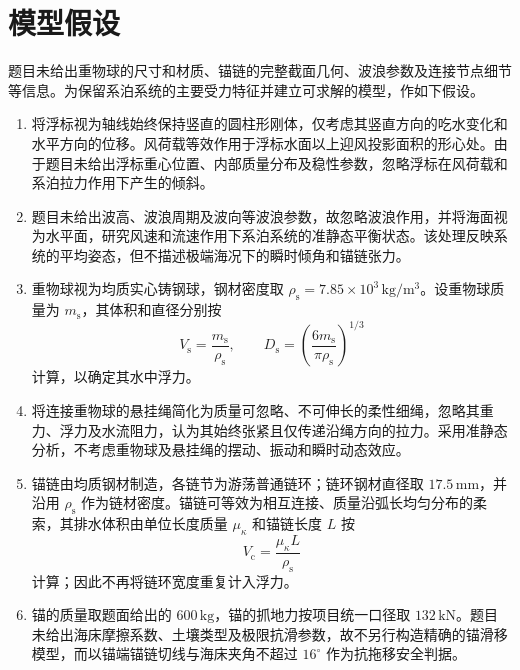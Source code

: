 \section{模型假设}
\label{sec:assumptions}

题目未给出重物球的尺寸和材质、锚链的完整截面几何、波浪参数及连接节点细节等信息。为保留系泊系统的主要受力特征并建立可求解的模型，作如下假设。

\begin{enumerate}[label=\arabic*., leftmargin=2.8em]
  \item 将浮标视为轴线始终保持竖直的圆柱形刚体，仅考虑其竖直方向的吃水变化和水平方向的位移。风荷载等效作用于浮标水面以上迎风投影面积的形心处。由于题目未给出浮标重心位置、内部质量分布及稳性参数，忽略浮标在风荷载和系泊拉力作用下产生的倾斜。

  \item 题目未给出波高、波浪周期及波向等波浪参数，故忽略波浪作用，并将海面视为水平面，研究风速和流速作用下系泊系统的准静态平衡状态。该处理反映系统的平均姿态，但不描述极端海况下的瞬时倾角和锚链张力。

  \item 重物球视为均质实心铸钢球，钢材密度取 \(\rho_{\mathrm s}=7.85\times10^{3}\,\mathrm{kg/m^3}\)。设重物球质量为 \(m_{\mathrm s}\)，其体积和直径分别按
  \begin{equation}
    V_{\mathrm s}=\frac{m_{\mathrm s}}{\rho_{\mathrm s}},
    \qquad
    D_{\mathrm s}=\left(\frac{6m_{\mathrm s}}{\pi\rho_{\mathrm s}}\right)^{1/3}
    \label{eq:ball-volume-diameter}
  \end{equation}
  计算，以确定其水中浮力。

  \item 将连接重物球的悬挂绳简化为质量可忽略、不可伸长的柔性细绳，忽略其重力、浮力及水流阻力，认为其始终张紧且仅传递沿绳方向的拉力。采用准静态分析，不考虑重物球及悬挂绳的摆动、振动和瞬时动态效应。

  \item 锚链由均质钢材制造，各链节为游荡普通链环；链环钢材直径取 \(17.5\,\mathrm{mm}\)，并沿用 \(\rho_{\mathrm s}\) 作为链材密度。锚链可等效为相互连接、质量沿弧长均匀分布的柔索，其排水体积由单位长度质量 \(\mu_{\kappa}\) 和锚链长度 \(L\) 按
  \begin{equation}
    V_{\mathrm c}=\frac{\mu_{\kappa}L}{\rho_{\mathrm s}}
    \label{eq:chain-displaced-volume}
  \end{equation}
  计算；因此不再将链环宽度重复计入浮力。

  \item 锚的质量取题面给出的 \(600\,\mathrm{kg}\)，锚的抓地力按项目统一口径取 \(132\,\mathrm{kN}\)。题目未给出海床摩擦系数、土壤类型及极限抗滑参数，故不另行构造精确的锚滑移模型，而以锚端锚链切线与海床夹角不超过 \(16^\circ\) 作为抗拖移安全判据。


\end{enumerate}
